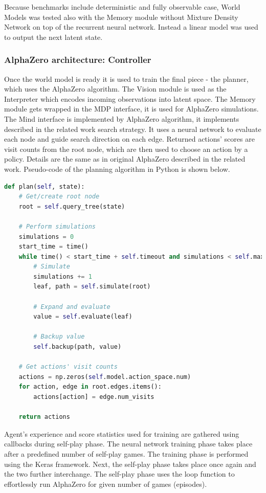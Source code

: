 Because benchmarks include deterministic and fully observable case, World Models was tested also with the Memory module without Mixture Density Network on top of the recurrent neural network. Instead a linear model was used to output the next latent state.

\subsubsection{AlphaZero architecture: Controller}
Once the world model is ready it is used to train the final piece - the planner, which uses the AlphaZero algorithm. The Vision module is used as the Interpreter which encodes incoming observations into latent space. The Memory module gets wrapped in the MDP interface, it is used for AlphaZero simulations. The Mind interface is implemented by AlphaZero algorithm, it implements described in the related work search strategy. It uses a neural network to evaluate each node and guide search direction on each edge. Returned actions' scores are visit counts from the root node, which are then used to choose an action by a policy. Details are the same as in original AlphaZero described in the related work. Pseudo-code of the planning algorithm in Python is shown below.

\begin{lstlisting}[language=Python]
def plan(self, state):
    # Get/create root node
    root = self.query_tree(state)

    # Perform simulations
    simulations = 0
    start_time = time()
    while time() < start_time + self.timeout and simulations < self.max_simulations:
        # Simulate
        simulations += 1
        leaf, path = self.simulate(root)

        # Expand and evaluate
        value = self.evaluate(leaf)

        # Backup value
        self.backup(path, value)

    # Get actions' visit counts
    actions = np.zeros(self.model.action_space.num)
    for action, edge in root.edges.items():
        actions[action] = edge.num_visits

    return actions
\end{lstlisting}

Agent's experience and score statistics used for training are gathered using callbacks during self-play phase. The neural network training phase takes place after a predefined number of self-play games. The training phase is performed using the Keras \cite{Code.Keras} framework. Next, the self-play phase takes place once again and the two further interchange. The self-play phase uses the loop function to effortlessly run AlphaZero for given number of games (episodes).

